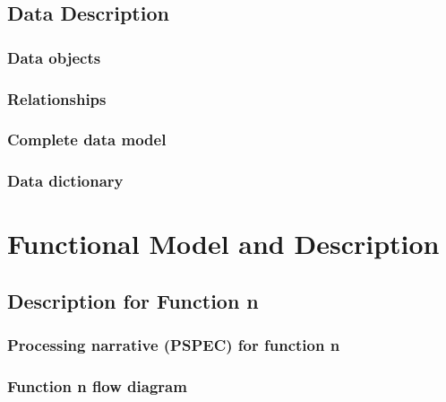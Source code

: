 \documentclass{article}
\begin{document}
\subsection{Data Description}

\subsubsection{Data objects}

\subsubsection{Relationships}

\subsubsection{Complete data model}

\subsubsection{Data dictionary}

\section{Functional Model and Description}

\subsection{Description for Function n}

\subsubsection{Processing narrative (PSPEC) for function n}

\subsubsection{Function n flow diagram}
\end{document}

